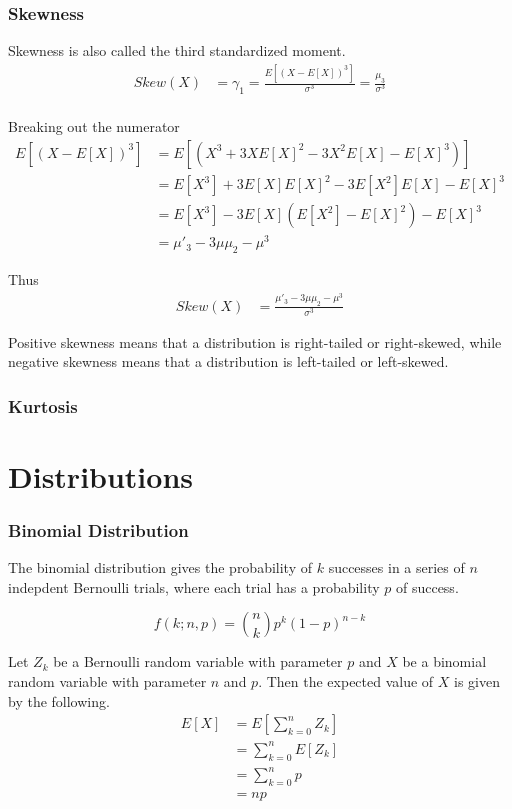 \documentclass{article}
\begin{document}
\section{Skewness}
Skewness is also called the third standardized moment.
\begin{align*}
  Skew(X)&=\gamma_1 = \frac{E[(X-E[X])^3]}{\sigma^3} = \frac{\mu_3}{\sigma^3}\\
\end{align*}

Breaking out the numerator
\begin{align*}
  E[(X-E[X])^3] &= E[(X^3   + 3XE[X]^2  - 3X^2E[X] - E[X]^3)]\\
  &= E[X^3] + 3E[X]E[X]^2 - 3E[X^2]E[X] - E[X]^3\\
  &= E[X^3] - 3E[X](E[X^2]-E[X]^2) - E[X]^3\\
  &= \mu'_3 - 3\mu \mu_2 - \mu^3
\end{align*}

Thus
\begin{align*}
  Skew(X)&=\frac{\mu'_3 - 3\mu \mu_2 - \mu^3}{\sigma^3}
\end{align*}


Positive skewness means that a distribution is right-tailed or right-skewed, while
negative skewness means that a distribution  is left-tailed or left-skewed.

\section{Kurtosis}

\part{Distributions}
\section{Binomial Distribution}

The binomial distribution gives the probability of $k$
successes in a series of $n$ indepdent Bernoulli trials, where each 
trial has a probability $p$ of success.

\begin{equation*}
  f(k;n,p)={n \choose k}p^k(1-p)^{n-k}
\end{equation*}

Let $Z_k$ be a Bernoulli random variable with parameter
$p$ and
$X$ be a binomial random variable with parameter $n$ and $p$.
Then the expected value of $X$ is given by the
following.
\begin{align*}
  E[X]&=E[\sum_{k=0}^n Z_k]\\
  &=\sum_{k=0}^nE[Z_k]\\
  &=\sum_{k=0}^np\\
  &=np
\end{align*}
\end{document}
